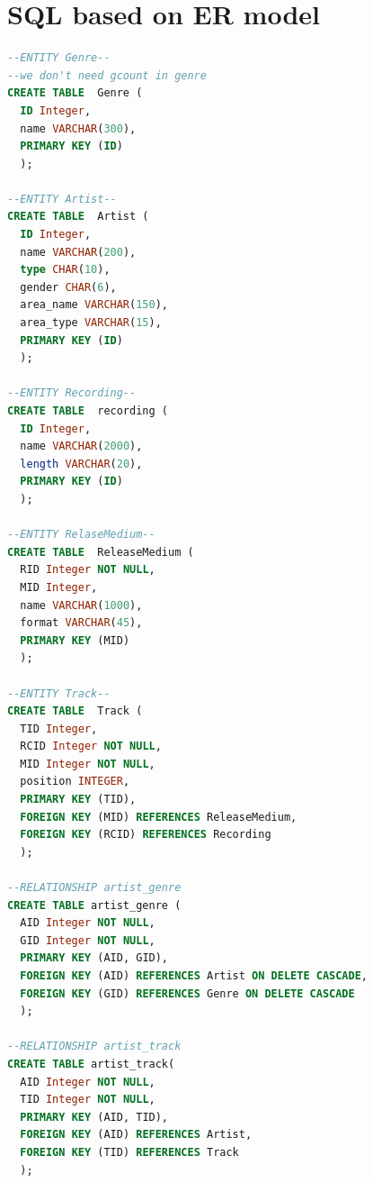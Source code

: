 \documentclass[11pt]{article} %
\begin{document}
\tiny{
\section{SQL based on ER model}
\begin{lstlisting}[language=SQL, keywordstyle=\color{blue!70},
commentstyle=\color{red!50!green!50!blue!50},
rulesepcolor=\color{red!20!green!20!blue!20},
frame=shadowbox]
--ENTITY Genre--
--we don't need gcount in genre
CREATE TABLE  Genre (
  ID Integer,
  name VARCHAR(300),
  PRIMARY KEY (ID)
  );

--ENTITY Artist--
CREATE TABLE  Artist (
  ID Integer,
  name VARCHAR(200),
  type CHAR(10),
  gender CHAR(6),
  area_name VARCHAR(150),
  area_type VARCHAR(15),
  PRIMARY KEY (ID)
  );
  
--ENTITY Recording--
CREATE TABLE  recording (
  ID Integer,
  name VARCHAR(2000),
  length VARCHAR(20),
  PRIMARY KEY (ID)
  );

--ENTITY RelaseMedium--
CREATE TABLE  ReleaseMedium (
  RID Integer NOT NULL,
  MID Integer,
  name VARCHAR(1000),
  format VARCHAR(45),
  PRIMARY KEY (MID)
  );

--ENTITY Track--
CREATE TABLE  Track (
  TID Integer,
  RCID Integer NOT NULL,
  MID Integer NOT NULL,
  position INTEGER,
  PRIMARY KEY (TID),
  FOREIGN KEY (MID) REFERENCES ReleaseMedium,
  FOREIGN KEY (RCID) REFERENCES Recording
  );
    
--RELATIONSHIP artist_genre
CREATE TABLE artist_genre (
  AID Integer NOT NULL,
  GID Integer NOT NULL,
  PRIMARY KEY (AID, GID),
  FOREIGN KEY (AID) REFERENCES Artist ON DELETE CASCADE,
  FOREIGN KEY (GID) REFERENCES Genre ON DELETE CASCADE
  );
    
--RELATIONSHIP artist_track
CREATE TABLE artist_track(
  AID Integer NOT NULL,
  TID Integer NOT NULL,
  PRIMARY KEY (AID, TID),
  FOREIGN KEY (AID) REFERENCES Artist,
  FOREIGN KEY (TID) REFERENCES Track
  );
\end{lstlisting}}
\end{document}
